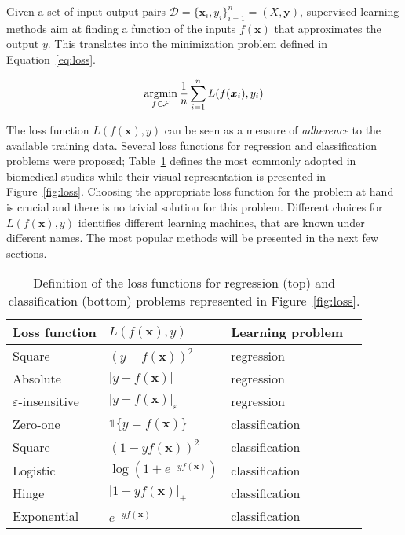	  Given a set of input-output pairs $\mathcal{D} = \{\bm{x}_i, y_i\}_{i=1}^n = (X, \bm{y})$, supervised learning methods aim at finding a function of the inputs $f(\bm{x})$ that approximates the output $y$. This translates into the minimization problem defined in Equation~\eqref{eq:loss}.

	  \begin{equation}\label{eq:loss}
	    \argmin_{f \in \mathcal{F}} \frac{1}{n}\sum_{i=1}^n L(f(\bm{x}_i),y_i) %
	  \end{equation}

	  The loss function $L(f(\bm{x}),y)$ can be seen as a measure of \textit{adherence} to the available training data. Several loss functions for regression and classification problems were proposed; Table~\ref{tab:losses} defines the most commonly adopted in biomedical studies while their visual representation is presented in Figure~\ref{fig:loss}.
	  Choosing the appropriate loss function for the problem at hand is crucial and there is no trivial solution for this problem.
	  Different choices for $L(f(\bm{x}),y)$ identifies different learning machines, that are known under different names. The most popular methods will be presented in the next few sections.

	  \begin{table}[!h]
	  	\centering
	  	\caption{Definition of the loss functions for regression (top) and classification (bottom) problems represented in Figure~\ref{fig:loss}.}\label{tab:losses}
	  	\begin{tabular}{@{}ll@{}ll@{}}
	  		\toprule
	  		Loss function & $L(f(\bm{x}),y)$  & Learning problem           \\ \midrule
	  		Square                   & $(y - f(\bm{x}))^2$ & regression \\
	  		Absolute                 & $|y - f(\bm{x})|$ & regression   \\
	  		$\varepsilon$-insensitive   & $|y - f(\bm{x})|_\varepsilon$  & regression                 \\
	  		\midrule
	  		Zero-one               & $\mathds{1}\{y=f(\bm{x})\}$ & classification \\
	  		Square                 & $(1 - yf(\bm{x}))^2$ & classification  \\
	  		Logistic                 & $\log(1 + e^{-yf(\bm{x})})$ & classification  \\
	  		Hinge                 & $|1 - yf(\bm{x})|_+$ & classification  \\
	  		Exponential & $e^{- yf(\bm{x})}$ & classification \\
	  		\bottomrule
	  	\end{tabular}
	  \end{table}

